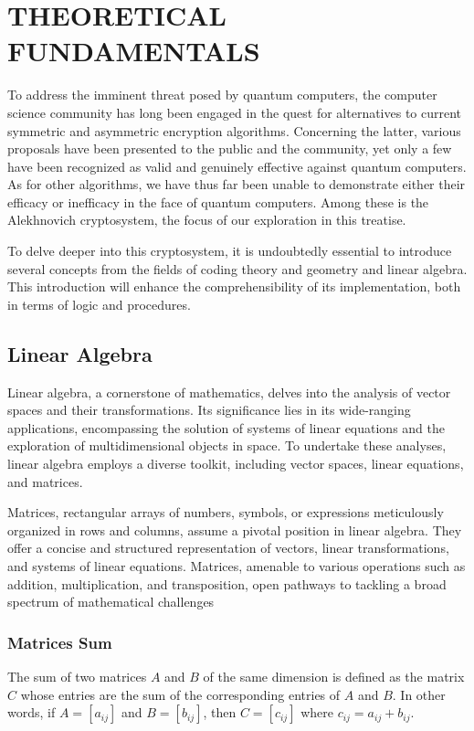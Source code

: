\chapter{THEORETICAL FUNDAMENTALS}

To address the imminent threat posed by quantum computers, the computer science community has long been engaged in the quest for alternatives to current symmetric and asymmetric encryption algorithms. Concerning the latter, various proposals have been presented to the public and the community, yet only a few have been recognized as valid and genuinely effective against quantum computers. As for other algorithms, we have thus far been unable to demonstrate either their efficacy or inefficacy in the face of quantum computers. Among these is the Alekhnovich cryptosystem, the focus of our exploration in this treatise.

To delve deeper into this cryptosystem, it is undoubtedly essential to introduce several concepts from the fields of coding theory and geometry and linear algebra. This introduction will enhance the comprehensibility of its implementation, both in terms of logic and procedures.

\section{Linear Algebra}
Linear algebra, a cornerstone of mathematics, delves into the analysis of vector spaces and their transformations. Its significance lies in its wide-ranging applications, encompassing the solution of systems of linear equations and the exploration of multidimensional objects in space. To undertake these analyses, linear algebra employs a diverse toolkit, including vector spaces, linear equations, and matrices.

Matrices, rectangular arrays of numbers, symbols, or expressions meticulously organized in rows and columns, assume a pivotal position in linear algebra. They offer a concise and structured representation of vectors, linear transformations, and systems of linear equations. Matrices, amenable to various operations such as addition, multiplication, and transposition, open pathways to tackling a broad spectrum of mathematical challenges

\subsection{Matrices Sum}
The sum of two matrices $A$ and $B$ of the same dimension is defined as the matrix $C$ whose entries are the sum of the corresponding entries of $A$ and $B$. In other words, if $A = [a_{ij}]$ and $B = [b_{ij}]$, then $C = [c_{ij}]$ where $c_{ij} = a_{ij} + b_{ij}$.


